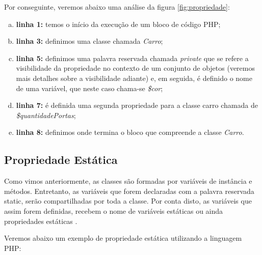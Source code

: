 Por conseguinte, veremos abaixo uma análise da figura \ref{fig:propriedade}:

\begin{enumerate}[a)]
    \item \textbf{linha 1:} temos o início da execução de um bloco de código PHP;
    \item \textbf{linha 3:} definimos uma classe chamada \textit{Carro};
    \item \textbf{linha 5:} definimos uma palavra reservada chamada
    \textit{private} que se refere a visibilidade da propriedade no contexto  de
    um conjunto de objetos (veremos mais detalhes sobre a visibilidade adiante) 
    e, em seguida, é definido o nome de uma variável, que neste caso chama-se
    \textit{\$cor};
    \item \textbf{linha 7:} é definida uma segunda propriedade para a classe
    carro chamada de \textit{\$quantidadePortas};
    \item \textbf{linha 8:} definimos onde termina o bloco que compreende a
    classe \textit{Carro}.
\end{enumerate}

\subsection{Propriedade Estática}

Como vimos anteriormente, as classes são formadas por variáveis de instância e
métodos. Entretanto, as variáveis que forem declaradas com a palavra reservada 
static, serão compartilhadas por toda a classe. Por conta disto, as variáveis 
que assim forem definidas, recebem o nome de variáveis estáticas ou ainda 
propriedades estáticas \cite{learningJava}.

Veremos abaixo um exemplo de propriedade estática utilizando a linguagem PHP:
